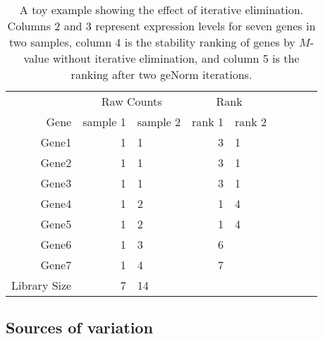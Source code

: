 		
		\begin{table}[ht] \centering \caption{A toy example showing the effect of
				iterative elimination. Columns 2 and 3 represent expression levels for
				seven genes in two samples, column 4 is the stability ranking of genes by
				$M$-value without iterative elimination, and column 5 is the ranking after
				two geNorm iterations.} 
			\begin{tabular}{rrp{2cm}rp{2cm}rp{2cm}rp{2cm}}
				\hline & \multicolumn{2}{c}{Raw Counts} & \multicolumn{2}{c}{Rank}\\
				Gene & sample 1 & sample 2 & rank 1 & rank 2 \\ \hline 
				Gene1 & 1 & 1 & 3 & 1 \\ 
				Gene2 & 1 & 1 & 3 & 1 \\ 
				Gene3 & 1 & 1 & 3 & 1 \\
				Gene4 & 1 & 2 & 1 & 4 \\ 
				Gene5 & 1 & 2 & 1 & 4 \\ 
				Gene6 & 1 & 3 & 6 &  \\ 
				Gene7 & 1 & 4 & 7 &  \\ \hline 
				Library Size & 7 & 14 & & 	\\ \hline 
				
			\end{tabular} \label{table:toyexample} \end{table}
		
		
		
		
		
		
		
		\subsection{Sources of variation}\label{Section:varianceComp}
		
